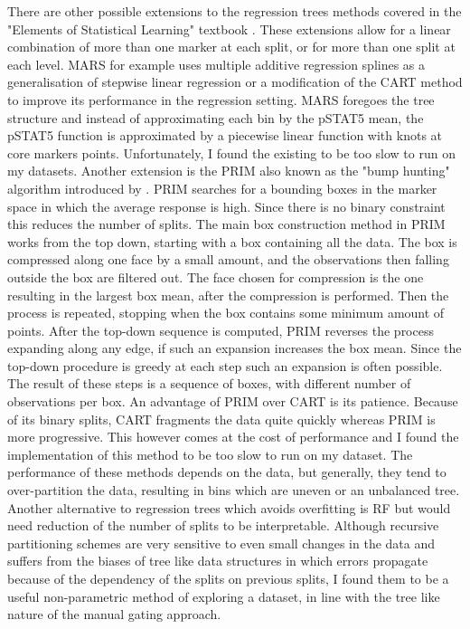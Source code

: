 There are other possible extensions to the regression trees methods covered in the "Elements of Statistical Learning" textbook \citep{Anonymous:ikywRZeA}.
These extensions allow for a linear combination of more than one marker at each split, or for more than one split at each level.
\gls{MARS} for example uses multiple additive regression splines as a generalisation of stepwise linear regression or a modification of the CART method to improve its performance in the regression setting.
\gls{MARS} foregoes the tree structure and instead of approximating each bin by the pSTAT5 mean, the pSTAT5 function is approximated by a piecewise linear function with knots at core markers points.
Unfortunately, I found the existing  to be too slow to run on my datasets.
Another extension is the \gls{PRIM} also known as the "bump hunting" algorithm introduced by \citet{Friedman:1999iy}.
\gls{PRIM} searches for a bounding boxes in the marker space in which the average response is high.
Since there is no binary constraint this reduces the number of splits.
The main box construction method in PRIM works from the top down, starting with a box containing all the data.
The box is compressed along one face by a small amount, and the observations then falling outside the box are filtered out.
The face chosen for compression is the one resulting in the largest box mean, after the compression is performed.
Then the process is repeated, stopping when the box contains some minimum amount of points.
After the top-down sequence is computed, PRIM reverses the process expanding along any edge, if such an expansion increases the box mean.
Since the top-down procedure is greedy at each step such an expansion is often possible.
The result of these steps is a sequence of boxes, with different number of observations per box.
An advantage of PRIM over CART is its patience. 
Because of its binary splits, CART fragments the data quite quickly whereas PRIM is more progressive.
This however comes at the cost of performance and I found the  implementation of this method to be too slow to run on my dataset.
%
The performance of these methods depends on the data, but generally, they tend to over-partition the data, resulting in bins which are uneven or an unbalanced tree.
Another alternative to regression trees which avoids overfitting is \gls{RF} but would need reduction of the number of splits to be interpretable.
Although recursive partitioning schemes are very sensitive to even small changes in the data and suffers from the biases of tree like data structures in which errors propagate because of the dependency of the splits on previous splits,
I found them to be a useful non-parametric method of exploring a dataset, in line with the tree like nature of the manual gating approach.


